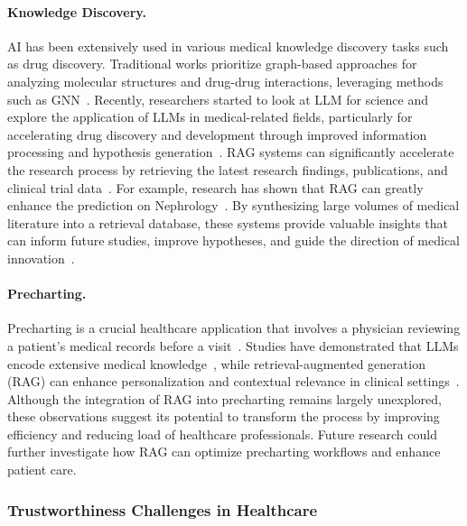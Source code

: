 \paragraph{Knowledge Discovery.}
AI has been extensively used in various medical knowledge discovery tasks such as drug discovery. Traditional works prioritize graph-based approaches for analyzing molecular structures and drug-drug interactions, leveraging methods such as GNN~\cite{Rohani2019, Rabeah2022}. Recently, researchers started to look at LLM for science and explore the application of LLMs in medical-related fields, particularly for accelerating drug discovery and development through improved information processing and hypothesis generation~\cite{Pal2023}. RAG systems can significantly accelerate the research process by retrieving the latest research findings, publications, and clinical trial data~\cite{Yang2025}. For example, research has shown that RAG can greatly enhance the prediction on Nephrology~\cite{Miao2024RAG}. By synthesizing large volumes of medical literature into a retrieval database, these systems provide valuable insights that can inform future studies, improve hypotheses, and guide the direction of medical innovation~\cite{Roy2024}.

\paragraph{Precharting.}
Precharting is a crucial healthcare application that involves a physician reviewing a patient's medical records before a visit~\cite{Bowman2021EMR}. Studies have demonstrated that LLMs encode extensive medical knowledge~\cite{Singhal2023LLM}, while retrieval-augmented generation (RAG) can enhance personalization and contextual relevance in clinical settings~\cite{Yang2025}. Although the integration of RAG into precharting remains largely unexplored, these observations suggest its potential to transform the process by improving efficiency and reducing load of healthcare professionals. Future research could further investigate how RAG can optimize precharting workflows and enhance patient care.

\subsubsection{Trustworthiness Challenges in Healthcare}
